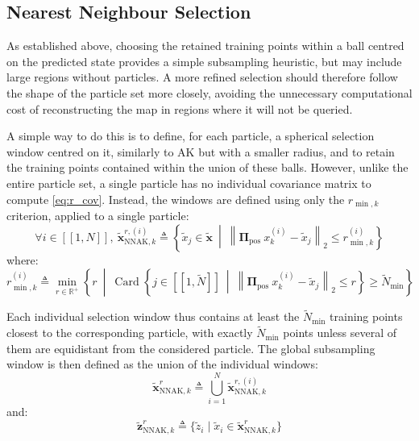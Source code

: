 \subsection{Nearest Neighbour Selection}

As established above, choosing the retained training points within a ball centred on the predicted state provides a simple subsampling heuristic, but may include large regions without particles. A more refined selection should therefore follow the shape of the particle set more closely, avoiding the unnecessary computational cost of reconstructing the map in regions where it will not be queried.

A simple way to do this is to define, for each particle, a spherical selection window centred on it, similarly to AK but with a smaller radius, and to retain the training points contained within the union of these balls. However, unlike the entire particle set, a single particle has no individual covariance matrix to compute \eqref{eq:r_cov}. Instead, the windows are defined using only the $r_{\min,k}$ criterion, applied to a single particle:
\begin{equation}
	\forall i\in[\![1,N]\!],\:\tilde{\mathbf{x}}_{\mathrm{NNAK},k}^{r,(i)}\triangleq\left\{\tilde{x}_j\in\tilde{\mathbf{x}}\:\middle|\:\left\|\boldsymbol{\Pi}_{\mathrm{pos}}\:x_k^{(i)}-\tilde{x}_j\right\|_2\leq r_{\min,k}^{(i)}\right\}
\end{equation}
where:
\begin{equation}
	r_{\min,k}^{(i)}\triangleq\underset{r\in\mathbb{R}^+}{\min}\left\{r\:\middle|\:\operatorname{Card}\left\{j\in[\![1,\tilde{N}]\!]\:\middle|\:\left\|\boldsymbol{\Pi}_{\mathrm{pos}}\:x_k^{(i)}-\tilde{x}_j\right\|_2\leq r\right\}\geq\tilde{N}_{\min}\right\}
\end{equation}

Each individual selection window thus contains at least the $\tilde{N}_{\min}$ training points closest to the corresponding particle, with exactly $\tilde{N}_{\min}$ points unless several of them are equidistant from the considered particle. The global subsampling window is then defined as the union of the individual windows:
\begin{equation}
	\tilde{\mathbf{x}}_{\mathrm{NNAK},k}^r\triangleq\bigcup_{i=1}^N\tilde{\mathbf{x}}_{\mathrm{NNAK},k}^{r,(i)}\label{eq:NNAK_window}
\end{equation}
and:
\begin{equation}
	\tilde{\mathbf{z}}_{\mathrm{NNAK},k}^r\triangleq\{\tilde{z}_i\mid\tilde{x}_i\in\tilde{\mathbf{x}}_{\mathrm{NNAK},k}^r\}
\end{equation}


